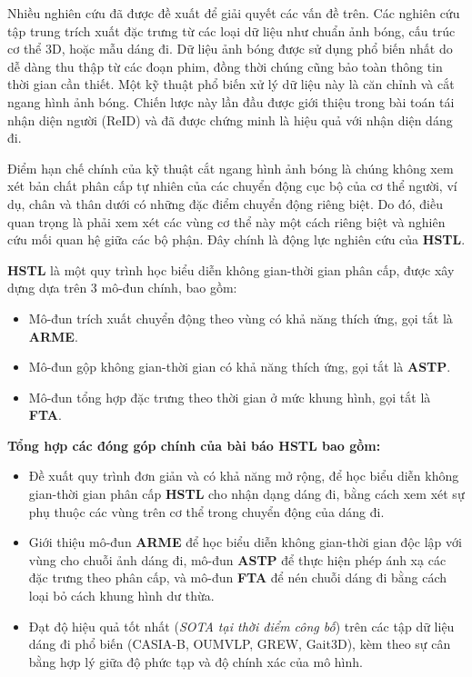 Nhiều nghiên cứu đã được đề xuất để giải quyết các vấn đề trên. Các nghiên cứu tập trung trích xuất đặc trưng từ các loại dữ liệu như chuẩn ảnh bóng, cấu trúc cơ thể 3D, hoặc mẫu dáng đi. Dữ liệu ảnh bóng được sử dụng phổ biến nhất do dễ dàng thu thập từ các đoạn phim, đồng thời chúng cũng bảo toàn thông tin thời gian cần thiết. Một kỹ thuật phổ biến xử lý dữ liệu này là căn chỉnh và cắt ngang hình ảnh bóng. Chiến lược này lần đầu được giới thiệu trong bài toán tái nhận diện người (ReID) và đã được chứng minh là hiệu quả với nhận diện dáng đi.

Điểm hạn chế chính của kỹ thuật cắt ngang hình ảnh bóng là chúng không xem xét bản chất phân cấp tự nhiên của các chuyển động cục bộ của cơ thể người, ví dụ, chân và thân dưới có những đặc điểm chuyển động riêng biệt. Do đó, điều quan trọng là phải xem xét các vùng cơ thể này một cách riêng biệt và nghiên cứu mối quan hệ giữa các bộ phận. Đây chính là động lực nghiên cứu của \textbf{HSTL}.


\textbf{HSTL} là một quy trình học biểu diễn không gian-thời gian phân cấp, được xây dựng dựa trên 3 mô-đun chính, bao gồm:
\begin{itemize}
    \item Mô-đun trích xuất chuyển động theo vùng có khả năng thích ứng, gọi tắt là \textbf{ARME}.
    \item Mô-đun gộp không gian-thời gian có khả năng thích ứng, gọi tắt là \textbf{ASTP}.
    \item Mô-đun tổng hợp đặc trưng theo thời gian ở mức khung hình, gọi tắt là \textbf{FTA}.
\end{itemize}

\textbf{Tổng hợp các đóng góp chính của bài báo \textbf{HSTL} bao gồm:}
\begin{itemize}
    \item  Đề xuất quy trình đơn giản và có khả năng mở rộng, để học biểu diễn không gian-thời gian phân cấp \textbf{HSTL} cho nhận dạng dáng đi, bằng cách xem xét sự phụ thuộc các vùng trên cơ thể trong chuyển động của dáng đi.
    \item Giới thiệu mô-đun \textbf{ARME} để học biểu diễn không gian-thời gian độc lập với vùng cho chuỗi ảnh dáng đi, mô-đun \textbf{ASTP} để thực hiện phép ánh xạ các đặc trưng theo phân cấp, và mô-đun \textbf{FTA} để nén chuỗi dáng đi bằng cách loại bỏ cách khung hình dư thừa.
    \item Đạt độ hiệu quả tốt nhất (\textit{SOTA tại thời điểm công bố}) trên các tập dữ liệu dáng đi phổ biến (CASIA-B, OUMVLP, GREW, Gait3D), kèm theo sự cân bằng hợp lý giữa độ phức tạp và độ chính xác của mô hình.
\end{itemize}

